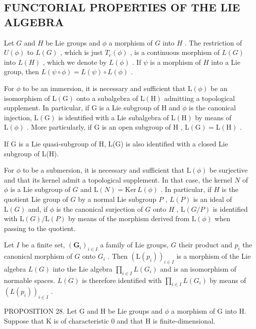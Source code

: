 \subsection{FUNCTORIAL PROPERTIES OF THE LIE ALGEBRA}

Let \(G\) and \(H\) be Lie groups and \(\phi\) a morphism of \(G\) into \(H\) . The restriction of \(U(\phi)\) to \(L(G)\) , which is just \(T_e(\phi)\) , is a continuous morphism of \(L(G)\) into \(L(H)\) , which we denote by \(L(\phi)\) . If \(\psi\) is a morphism of \(H\) into a Lie group, then \(L(\psi \circ \phi) = L(\psi) \circ L(\phi)\) .

For \(\phi\) to be an immersion, it is necessary and sufficient that \(\mathrm{L}(\phi)\) be an isomorphism of \(\mathrm{L}(\mathrm{G})\) onto a subalgebra of \(\mathrm{L}(\mathrm{H})\) admitting a topological supplement. In particular, if \(\mathrm{G}\) is a Lie subgroup of \(\mathrm{H}\) and \(\phi\) is the canonical injection, \(\mathrm{L}(\mathrm{G})\) is identified with a Lie subalgebra of \(\mathrm{L}(\mathrm{H})\) by means of \(\mathrm{L}(\phi)\) . More particularly, if \(\mathrm{G}\) is an open subgroup of \(\mathrm{H}\) , \(\mathrm{L}(\mathrm{G}) = \mathrm{L}(\mathrm{H})\) .

If G is a Lie quasi-subgroup of H, L(G) is also identified with a closed Lie subgroup of L(H).

For \(\phi\) to be a submersion, it is necessary and sufficient that \(\mathrm{L}(\phi)\) be surjective and that its kernel admit a topological supplement. In that case, the kernel \(N\) of \(\phi\) is a Lie subgroup of \(G\) and \(\mathrm{L}(N) = \mathrm{Ker} \, L(\phi)\) . In particular, if \(H\) is the quotient Lie group of \(G\) by a normal Lie subgroup \(P\) , \(L(P)\) is an ideal of \(\mathrm{L}(G)\) and, if \(\phi\) is the canonical surjection of \(G\) onto \(H\) , \(\mathrm{L}(G/P)\) is identified with \(\mathrm{L}(G)/\mathrm{L}(P)\) by means of the morphism derived from \(\mathrm{L}(\phi)\) when passing to the quotient.

Let \(I\) be a finite set, \((\mathbf{G}_{i})_{i\in I}\) a family of Lie groups, \(G\) their product and \(p_i\) the canonical morphism of \(G\) onto \(G_i\) . Then \((\mathrm{L}(p_i))_{i\in I}\) is a morphism of the Lie algebra \(L(G)\) into the Lie algebra \(\prod_{i\in I} L(G_i)\) and is an isomorphism of normable spaces. \(L(G)\) is therefore identified with \(\prod_{i\in I} L(G_i)\) by means of \((L(p_i))_{i\in I}\) .

PROPOSITION 28. Let G and H be Lie groups and \(\phi\) a morphism of G into H. Suppose that K is of characteristic 0 and that H is finite-dimensional.

